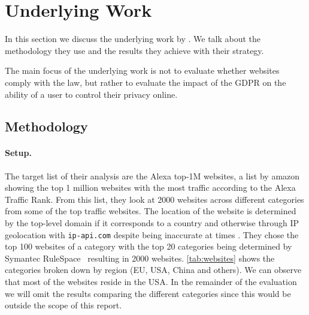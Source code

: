 \section{Underlying Work}
\label{sec:underlying}

In this section we discuss the underlying work by . We talk about the methodology they use and the
results they achieve with their strategy.

The main focus of the underlying work is not to evaluate whether websites comply with the law, but rather to evaluate
the impact of the GDPR on the ability of a user to control their privacy online.

\subsection{Methodology}
\label{subsec:methodology}

\paragraph{Setup.}
The target list of their analysis are the Alexa top-1M websites, a list by amazon showing the top 1 million websites with
the most traffic according to the Alexa Traffic Rank. From this list, they look at 2000 websites across different
categories from some of the top traffic websites. The location of the website is determined by the top-level domain 
if it corresponds to a country and otherwise through IP geolocation with \texttt{ip-api.com} despite being inaccurate at
times \cite{weinberg2018catch}. They chose the top 100 websites of a category with the top 20 categories being determined
by Symantec RuleSpace~\cite{symantec} resulting in 2000 websites. \autoref{tab:websites} shows the categories broken
down by region (EU, USA, China and others). We can observe that most of the websites reside in the USA. In the remainder of the evaluation we will omit the
results comparing the different categories since this would be outside the scope of this report.

